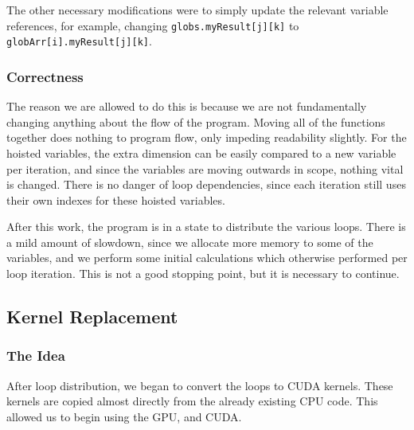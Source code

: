 \documentclass[12pt, oneside]{article}
\begin{document}
The other necessary modifications were to simply update the relevant variable references, for example, changing \texttt{globs.myResult[j][k]} to\\ \texttt{globArr[i].myResult[j][k]}.
\subsubsection{Correctness}
The reason we are allowed to do this is because we are not fundamentally changing anything about the flow of the program. Moving all of the functions together does nothing to program flow, only impeding readability slightly. For the hoisted variables, the extra dimension can be easily compared to a new variable per iteration, and since the variables are moving outwards in scope, nothing vital is changed. There is no danger of loop dependencies, since each iteration still uses their own indexes for these hoisted variables.
			
After this work, the program is in a state to distribute the various loops. There is a mild amount of slowdown, since we allocate more memory to some of the variables, and we perform some initial calculations which otherwise performed per loop iteration. This is not a good stopping point, but it is necessary to continue.
\subsection{Kernel Replacement}
\subsubsection{The Idea}
After loop distribution, we began to convert the loops to CUDA kernels. These kernels are copied almost directly from the already existing CPU code. This allowed us to begin using the GPU, and CUDA.
\end{document}
